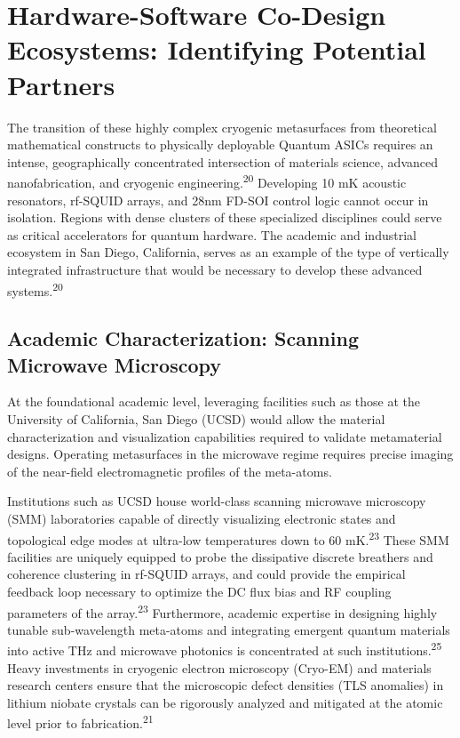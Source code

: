 \documentclass[11pt, a4paper]{article}
\begin{document}
\section*{Hardware-Software Co-Design Ecosystems: Identifying Potential Partners}

The transition of these highly complex cryogenic metasurfaces from theoretical mathematical constructs to physically deployable Quantum ASICs requires an intense, geographically concentrated intersection of materials science, advanced nanofabrication, and cryogenic engineering.\textsuperscript{20} Developing 10 mK acoustic resonators, rf-SQUID arrays, and 28nm FD-SOI control logic cannot occur in isolation. Regions with dense clusters of these specialized disciplines could serve as critical accelerators for quantum hardware. The academic and industrial ecosystem in San Diego, California, serves as an example of the type of vertically integrated infrastructure that would be necessary to develop these advanced systems.\textsuperscript{20}

\subsection*{Academic Characterization: Scanning Microwave Microscopy}

At the foundational academic level, leveraging facilities such as those at the University of California, San Diego (UCSD) would allow the material characterization and visualization capabilities required to validate metamaterial designs. Operating metasurfaces in the microwave regime requires precise imaging of the near-field electromagnetic profiles of the meta-atoms.

Institutions such as UCSD house world-class scanning microwave microscopy (SMM) laboratories capable of directly visualizing electronic states and topological edge modes at ultra-low temperatures down to 60 mK.\textsuperscript{23} These SMM facilities are uniquely equipped to probe the dissipative discrete breathers and coherence clustering in rf-SQUID arrays, and could provide the empirical feedback loop necessary to optimize the DC flux bias and RF coupling parameters of the array.\textsuperscript{23} Furthermore, academic expertise in designing highly tunable sub-wavelength meta-atoms and integrating emergent quantum materials into active THz and microwave photonics is concentrated at such institutions.\textsuperscript{25} Heavy investments in cryogenic electron microscopy (Cryo-EM) and materials research centers ensure that the microscopic defect densities (TLS anomalies) in lithium niobate crystals can be rigorously analyzed and mitigated at the atomic level prior to fabrication.\textsuperscript{21}
\end{document}
